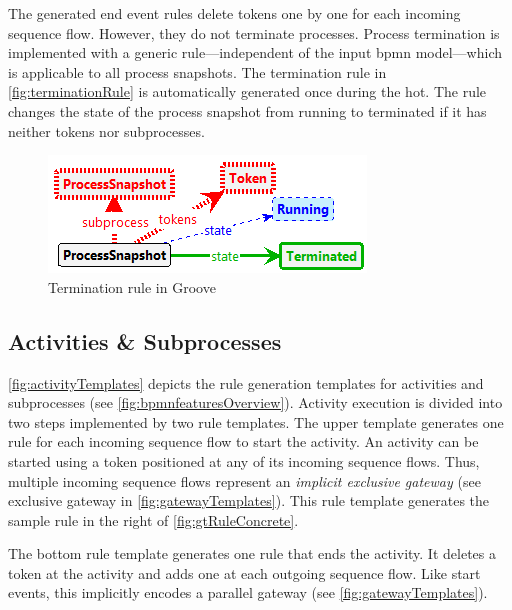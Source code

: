 \documentclass[runningheads]{llncs}
\begin{document}
The generated end event rules delete tokens one by one for each incoming sequence flow.
However, they do not terminate processes.
Process termination is implemented with a generic rule---independent of the input \gls*{bpmn} model---which is applicable to all process snapshots.
The termination rule in \autoref{fig:terminationRule} is automatically generated once during the \gls*{hot}.
The rule changes the state of the process snapshot from running to terminated if it has neither tokens nor subprocesses.

\begin{figure}[ht]
    \centering
    \includegraphics[width=.5\textwidth]{images/terminate_groove.png}
    \caption{Termination rule in Groove}
    \label{fig:terminationRule}
\end{figure}

\subsection{Activities \& Subprocesses}

\autoref{fig:activityTemplates} depicts the rule generation templates for activities and subprocesses (see \autoref{fig:bpmnfeaturesOverview}).
Activity execution is divided into two steps implemented by two rule templates.
The upper template generates one rule for each incoming sequence flow to start the activity.
An activity can be started using a token positioned at any of its incoming sequence flows.
Thus, multiple incoming sequence flows represent an \textit{implicit exclusive gateway} (see exclusive gateway in \autoref{fig:gatewayTemplates}).
This rule template generates the sample rule in the right of \autoref{fig:gtRuleConcrete}.

The bottom rule template generates one rule that ends the activity.
It deletes a token at the activity and adds one at each outgoing sequence flow.
Like start events, this implicitly encodes a parallel gateway (see \autoref{fig:gatewayTemplates}). 
\end{document}
